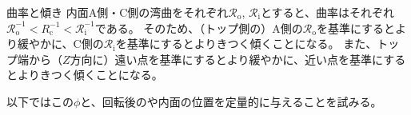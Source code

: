 \begin{\Columnname}{曲率と傾き}
内面A側・C側の湾曲をそれぞれ$\mathcal R_\mathrm o$, $\mathcal R_\mathrm i$とすると、曲率はそれぞれ$\mathcal R_\mathrm o^{-1} < R_\mathrm c^{-1} < \mathcal R_\mathrm i^{-1}$である。
そのため、（トップ側の）A側の$\mathcal R_\mathrm o$を基準にするとより緩やかに、C側の$\mathcal R_\mathrm i$を基準にするとよりきつく傾くことになる。
また、トップ端から（$Z$方向に）遠い点を基準にするとより緩やかに、近い点を基準にするとよりきつく傾くことになる。
\end{\Columnname}

以下ではこの\DimpleAngle$\phi$と、回転後の\Dimple や内面の位置を定量的に与えることを試みる。



